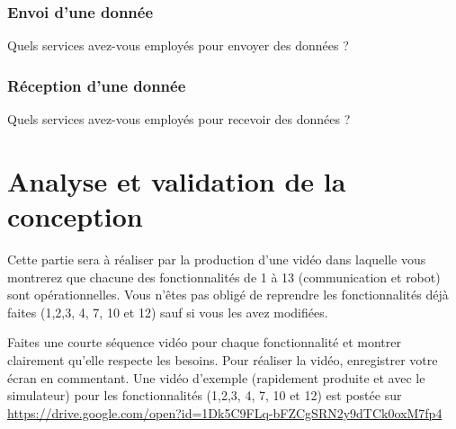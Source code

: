 \documentclass[11pt, a4paper]{paper}
\begin{document}
\subsubsection{Envoi d’une donnée}
 {\color{blue} Quels services avez-vous employés pour envoyer des données ?}

\subsubsection{Réception d’une donnée}
 {\color{blue} Quels services avez-vous employés pour recevoir des données ?}

 {\color{red}
 \section{Analyse et validation de la conception}

Cette partie sera à réaliser par la production d'une vidéo dans laquelle vous montrerez que chacune des fonctionnalités de 1 à 13 (communication et robot) sont opérationnelles. Vous n'êtes pas obligé de reprendre les fonctionnalités déjà faites (1,2,3, 4, 7, 10 et 12) sauf si vous les avez modifiées. 

Faites une courte séquence vidéo pour chaque fonctionnalité et montrer clairement qu'elle respecte les besoins. Pour réaliser la vidéo, enregistrer votre écran en commentant. Une vidéo d'exemple (rapidement produite et avec le simulateur) pour les fonctionnalités (1,2,3, 4, 7, 10 et 12) est postée sur \url{https://drive.google.com/open?id=1Dk5C9FLq-bFZCgSRN2y9dTCk0oxM7fp4}}

 
\end{document}
